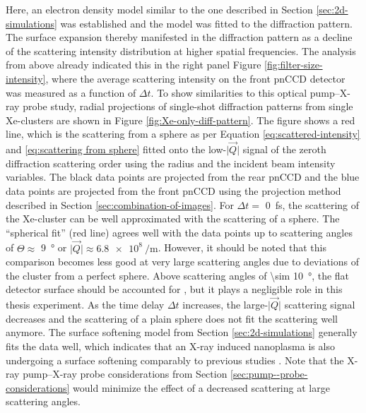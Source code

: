 Here, an electron density model similar to the one described in Section \ref{sec:2d-simulations} was established and the model was fitted to the diffraction pattern. The surface expansion thereby manifested in the diffraction pattern as a decline of the scattering intensity distribution at higher spatial frequencies. The analysis from above already indicated this in the right panel Figure \ref{fig:filter-size-intensity}, where the average scattering intensity on the front pnCCD detector was measured as a function of $\Delta t$. To show similarities to this optical pump--X-ray probe study, radial projections of single-shot diffraction patterns from single Xe-clusters are shown in Figure \ref{fig:Xe-only-diff-pattern}. The figure shows a red line, which is the scattering from a sphere as per Equation \eqref{eq:scattered-intensity} and \eqref{eq:scattering from sphere} fitted onto the low-$\lvert\vec{Q}\rvert$ signal of the zeroth diffraction scattering order using the radius and the incident beam intensity variables. The black data points are projected from the rear pnCCD and the blue data points are projected from the front pnCCD using the projection method described in Section \ref{sec:combination-of-images}. For $\Delta t=$ \SI{0}{\femto\second}, the scattering of the Xe-cluster can be well approximated with the scattering of a sphere. The ``spherical fit'' (red line) agrees well with the data points up to scattering angles of $\Theta \approx$ \SI{9}{\degree} or $\lvert\vec{Q}\rvert\approx\SI{6.8e8}{\per\meter}$. However, it should be noted that this comparison becomes less good at very large scattering angles due to deviations of the cluster from a perfect sphere. Above scattering angles of \SI{\sim 10}{\degree}, the flat detector surface should be accounted for \citep{Bostedt-2012-PRL}, but it plays a negligible role in this thesis experiment. As the time delay $\Delta t$ increases, the large-$\lvert\vec{Q}\rvert$ scattering signal decreases and the scattering of a plain sphere does not fit the scattering well anymore. The surface softening model from Section \ref{sec:2d-simulations} generally fits the data well, which indicates that an X-ray induced nanoplasma is also undergoing a surface softening comparably to previous studies \cite{Gorkhover-2016-NatPho,Gorkhover-2014-Thesis}. Note that the X-ray pump--X-ray probe considerations from Section \ref{sec:pump--probe-considerations} would minimize the effect of a decreased scattering at large scattering angles.\\[1\baselineskip]
%
%
